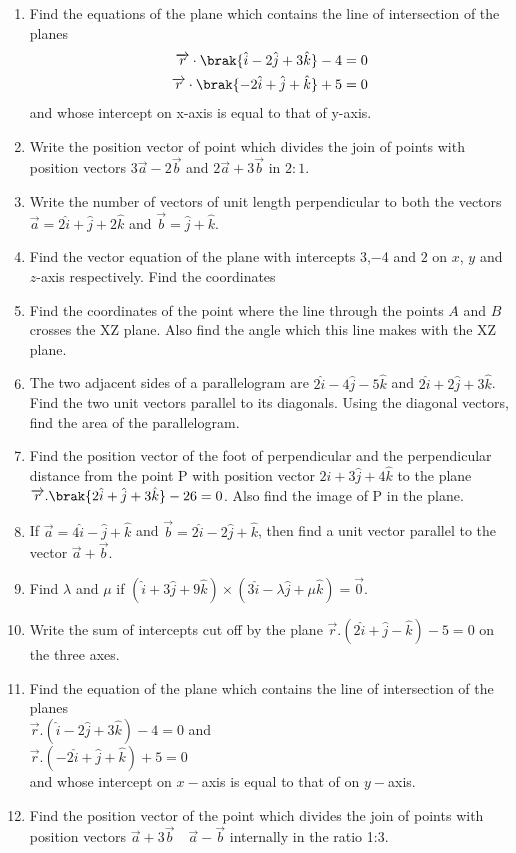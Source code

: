 \begin{enumerate}
	\item Find the equations of the plane which contains the line of intersection of the planes
	      \begin{align*}
		      \overrightarrow{r}\cdot\brak{\hat{i} -2\hat{j} + 3\hat{k}}-4  & =0 \\
		      \overrightarrow{r}\cdot\brak{-2\hat{i} + \hat{j} + \hat{k}}+5 & =0
	      \end{align*}
	      and whose intercept on x-axis is equal to that of y-axis.
	\item Write the position vector of point which divides the join of points with position vectors  ${3\overrightarrow{a}-2\overrightarrow{b}}$ and ${2\overrightarrow{a}+3\overrightarrow{b}}$ in $2:1$.
	\item Write the number of vectors of unit length perpendicular to both the vectors $\overrightarrow{a} = 2\hat{i} + \hat{j}+2\hat{k}$ and $\overrightarrow{b}=\hat{j}+\hat{k}$.
	\item Find the vector equation of the plane with intercepts $3$,$-$4 and $2$ on $x$, $y$ and $z$-axis respectively.
	      Find the coordinates
	\item Find the coordinates of the point where the line through the points $A$ and $B$ crosses the $\mathrm{XZ}$ plane. Also find the angle which this line makes with the $\mathrm{XZ}$ plane.
	\item The two adjacent sides of a parallelogram are $2\hat{i} - 4\hat{j}-5\hat{k}$ and $2\hat{i}+2\hat{j}+3\hat{k}$. Find the two unit vectors parallel to its diagonals. Using the diagonal vectors, find the area of the parallelogram.
	\item Find the position vector of the foot of perpendicular and the perpendicular distance from the point P with position vector $2\hat{i}+3\hat{j}+4\hat{k}$ to the plane $\overrightarrow{r}.\brak{2\hat{i}+\hat{j}+3\hat{k}} - 26 = 0$. Also find the image of P in the plane.
	\item If $\overrightarrow{a}=4\hat{i}-\hat{j}+\hat{k}$ and $\overrightarrow{b}=2\hat{i}-2\hat{j}+\hat{k}$, then find a unit vector parallel to the vector $\overrightarrow{a}+\overrightarrow{b}$.
	\item Find ${\lambda}$ and ${\mu}$  if $(\hat{i}+3\hat{j}+9\hat{k})\times(3\hat{i}-\lambda\hat{j}+\mu\hat{k})=\overrightarrow{0}$.
	\item Write the sum of intercepts cut off by the plane $\overrightarrow{r}$.$(2\hat{i}+\hat{j}-\hat{k})-5=0$ on the three axes.
	\item Find the equation of the plane which contains the line of intersection of the planes \\
	      $\overrightarrow{r}.(\hat{i}-2\hat{j}+3\hat{k})-4=0$ and \\
	      $\overrightarrow{r}.(-2\hat{i}+\hat{j}+\hat{k})+5=0$ \\
	      and whose intercept on $x-$axis is equal to that of on $y-$axis.
	\item Find the position vector of the point which divides the join of points with position vectors $\overrightarrow{a}+ 3\overrightarrow{b} \quad $\quad $\overrightarrow{a} - \overrightarrow{b} $ internally in the ratio 1:3.


\end{enumerate}
